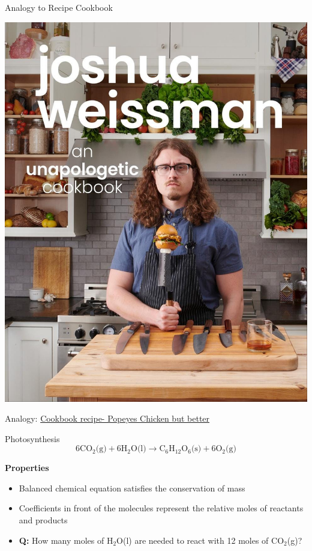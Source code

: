 \documentclass[11pt]{beamer}
\begin{document}
\begin{frame}{Analogy to Recipe Cookbook}
  \begin{center}
    \includegraphics[scale=0.11]{josh_weiss}
  \end{center}

  Analogy: \href{https://www.youtube.com/watch?v=T5SYu8tyKjM}{Cookbook recipe-
    Popeyes Chicken but better}
\end{frame}

\begin{frame}{Photosynthesis}
  \begin{equation}
    6\text{CO$_2$(g)} + 6\text{H$_2$O(l)} \rightarrow \text{C$_6$H$_{12}$O$_6$(s)}
    + 6\text{O$_2$(g)}
  \end{equation}

  \textbf{Properties}
  \begin{itemize}
  \item Balanced chemical equation satisfies the conservation of mass
  \item Coefficients in front of the molecules represent the relative
    moles of reactants and products
  \item \textbf{Q:} How many moles of H$_2$O(l) are needed to react with 12
    moles of CO$_2$(g)?
  \end{itemize}
\end{frame}
\end{document}
